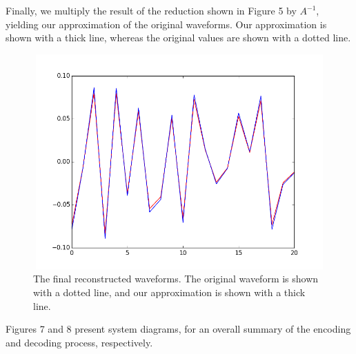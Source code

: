 \documentclass{amsart}
\begin{document}
Finally, we multiply the result of the reduction shown in Figure 5 by $A^{-1}$, yielding our approximation of the original waveforms. Our approximation is shown with a thick line, whereas the original values are shown with a dotted line. \\

\begin{figure}
\begin{center}
\includegraphics[height=3.25in,width=5in,angle=0]{reconstructions.png}
\caption{The final reconstructed waveforms. The original waveform is shown with a dotted line, and our approximation is shown with a thick line.}
\end{center}
\end{figure}

Figures 7 and 8 present system diagrams, for an overall summary of the encoding and decoding process, respectively. \\






\end{document}
